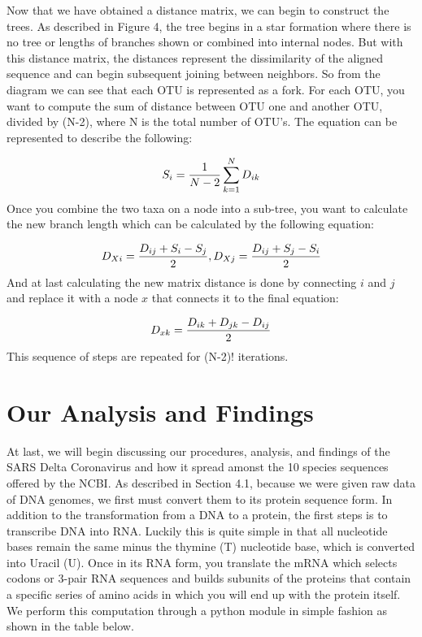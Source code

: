 Now that we have obtained a distance matrix, we can begin to construct the trees. As described in Figure 4, the tree begins in a star formation where there is no tree or lengths of branches shown or combined into internal nodes. But with this distance matrix, the distances represent the dissimilarity of the aligned sequence and can begin subsequent joining between neighbors. So from the diagram we can see that each OTU is represented as a fork. For each OTU, you want to compute the sum of distance between OTU one and another OTU, divided by (N-2), where N is the total number of OTU's. The equation can be represented to describe the following: 

\begin{equation}
\label{computation}
S_i=\frac{1}{N-2}\sum_{k=1}^{N} D_{ik}\\
\end{equation}
Once you combine the two taxa on a node into a sub-tree, you want to calculate the new branch length which can be calculated by the following equation:

\begin{equation}
\label{branch-length}
D_{Xi} = \frac{D_{ij}+S_i-S_j}{2}, D_{Xj} = \frac{D_{ij}+S_j-S_i}{2}\\
\end{equation}
And at last calculating the new matrix distance is done by connecting $i$ and $j$ and replace it with a node $x$ that connects it to the final equation:

\begin{equation}
\label{branch-length}
D_{xk}=\frac{D_{ik}+D_{jk}-D_{ij}}{2}\\
\end{equation}
This sequence of steps are repeated for (N-2)! iterations.


\section{Our Analysis and Findings}

At last, we will begin discussing our procedures, analysis, and findings of the SARS Delta Coronavirus and how it spread amonst the 10 species sequences offered by the NCBI. As described in Section 4.1, because we were given raw data of DNA genomes, we first must convert them to its protein sequence form. In addition to the transformation from a DNA to a protein, the first steps is to transcribe DNA into RNA. Luckily this is quite simple in that all nucleotide bases remain the same minus the thymine (T) nucleotide base, which is converted into Uracil (U). Once in its RNA form, you translate the mRNA which selects codons or 3-pair RNA sequences and builds subunits of the proteins that contain a specific series of amino acids in which you will end up with the protein itself. We perform this computation through a python module in simple fashion as shown in the table below.

